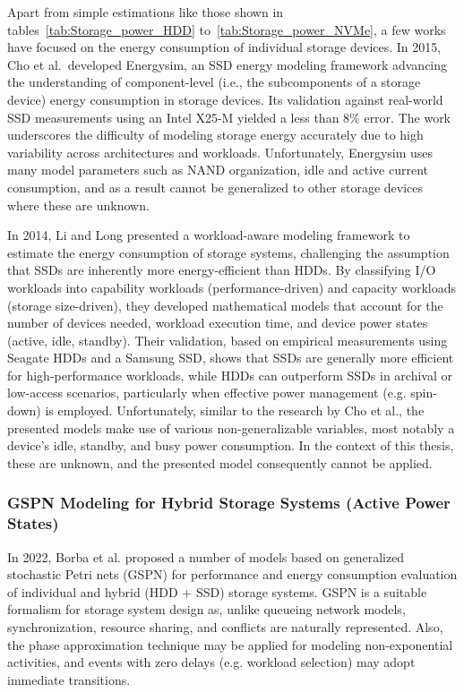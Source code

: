 Apart from simple estimations like those shown in tables~\ref{tab:Storage_power_HDD} to~\ref{tab:Storage_power_NVMe}, a few works have focused on the energy consumption of individual storage devices. In 2015, Cho et al.\ developed Energysim\parencite{choDesignTradeoffsSSDs2015}, an SSD energy modeling framework advancing the understanding of component-level (i.e., the subcomponents of a storage device) energy consumption in storage devices. Its validation against real-world SSD measurements using an Intel X25-M yielded a less than 8\% error. The work underscores the difficulty of modeling storage energy accurately due to high variability across architectures and workloads. Unfortunately, Energysim uses many model parameters such as NAND organization, idle and active current consumption, and as a result cannot be generalized to other storage devices where these are unknown.

In 2014, Li and Long\parencite{liWhichStorageDevice2014} presented a workload-aware modeling framework to estimate the energy consumption of storage systems, challenging the assumption that SSDs are inherently more energy-efficient than HDDs. By classifying I/O workloads into capability workloads (performance-driven) and capacity workloads (storage size-driven), they developed mathematical models that account for the number of devices needed, workload execution time, and device power states (active, idle, standby). Their validation, based on empirical measurements using Seagate HDDs and a Samsung SSD, shows that SSDs are generally more efficient for high-performance workloads, while HDDs can outperform SSDs in archival or low-access scenarios, particularly when effective power management (e.g. spin-down) is employed. Unfortunately, similar to the research by Cho et al., the presented models make use of various non-generalizable variables, most notably a device's idle, standby, and busy power consumption. In the context of this thesis, these are unknown, and the presented model consequently cannot be applied.

\subsubsection{GSPN Modeling for Hybrid Storage Systems (Active Power States)}

In 2022, Borba et al.\parencite{borbaModelingApproachEstimating2022} proposed a number of models based on generalized stochastic Petri nets (GSPN) for performance and energy consumption evaluation of individual and hybrid (HDD + SSD) storage systems. GSPN is a suitable formalism for storage system design as, unlike queueing network models, synchronization, resource sharing, and conflicts are naturally represented. Also, the phase approximation technique may be applied for modeling non-exponential activities, and events with zero delays (e.g. workload selection) may adopt immediate transitions.

